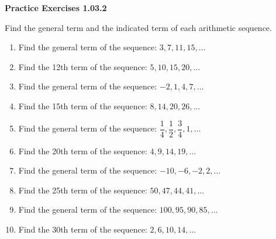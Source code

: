 \vspace{0.3ex}
\noindent\textbf{Practice Exercises 1.03.2}

\vspace{0.2ex}

Find the general term and the indicated term of each arithmetic sequence.
\begin{enumerate}
    \item Find the general term of the sequence: $3, 7, 11, 15, \dots$
    \item Find the 12th term of the sequence: $5, 10, 15, 20, \dots$
    \item Find the general term of the sequence: $-2, 1, 4, 7, \dots$
    \item Find the 15th term of the sequence: $8, 14, 20, 26, \dots$
    \item Find the general term of the sequence: $\dfrac{1}{4}, \dfrac{1}{2}, \dfrac{3}{4}, 1, \dots$
    \item Find the 20th term of the sequence: $4, 9, 14, 19, \dots$
    \item Find the general term of the sequence: $-10, -6, -2, 2, \dots$
    \item Find the 25th term of the sequence: $50, 47, 44, 41, \dots$
    \item Find the general term of the sequence: $100, 95, 90, 85, \dots$
    \item Find the 30th term of the sequence: $2, 6, 10, 14, \dots$
\end{enumerate}
